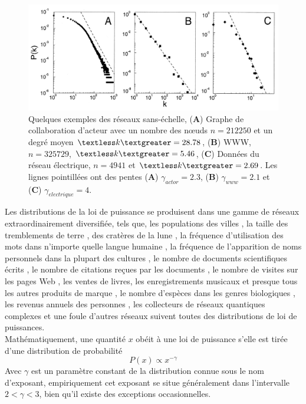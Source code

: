 \begin{figure}[h!]
\centering
\includegraphics[scale=0.3]{./figures/scal-free-reels}
\caption{Quelques exemples des réseaux sans-échelle, (\textbf{A}) Graphe de collaboration d'acteur avec un nombre des nœuds
$n=212250$ et un degré moyen $\textless k\textgreater=28.78$, (\textbf{B}) WWW, $n=325729$, $\textless k\textgreater=5.46$,
(\textbf{C}) Données du réseau électrique, $n=4941$ et $\textless k\textgreater=2.69$. Les lignes pointillées ont des pentes
(\textbf{A}) $\gamma_{actor}=2.3$, (\textbf{B}) $\gamma_{www}=2.1$ et (\textbf{C}) $\gamma_{electrique}=4$.}

\label{scal-free-reels}
\end{figure}
Les distributions de la loi de puissance se produisent dans une gamme de réseaux extraordinairement diversifiée, tels que, les populations des  villes \cite{New2005,Aa-al2009}, la taille des tremblements de terre \cite{GuR1944}, des cratères de la lune  \cite{NeI1994}, la fréquence d'utilisation des mots dans n'importe quelle langue humaine \cite{Zipf1949,Estoup1916}, la  fréquence de l'apparition de noms personnels dans la plupart des cultures \cite{ZaM2001}, le nombre de documents scientifiques écrits \cite{LoW1926}, le nombre de citations reçues par les documents \cite{Price1965}, le nombre de visites sur les pages Web \cite{AdH2000}, les ventes de livres, les enregistrements musicaux et presque tous les autres produits de marque \cite{Cox-al1995}, le nombre d'espèces dans les genres biologiques \cite{WilY1922}, les revenus annuels des personnes \cite{Pareto1896}, les collecteurs de réseaux quantiques complexes \cite{BiR2015} et une foule d'autres réseaux suivent toutes des distributions de loi de puissances.\\

Mathématiquement, une quantité $x$ obéit à une loi de puissance s'elle est tirée d'une distribution de probabilité
\begin{equation}
 P(x)\propto x^{-\gamma}
\end{equation}
Avec $\gamma$ est un paramètre constant de la distribution connue sous le nom d'exposant, empiriquement cet exposant se situe
généralement dans l'intervalle $2<\gamma<3$, bien qu'il existe des exceptions occasionnelles.

